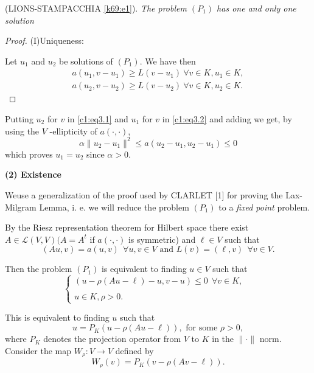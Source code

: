 \begin{theorem}\label{c1:thm3.1}%
(LIONS-STAMPACCHIA \ref{k69:e1}). {\em The problem $(P_1)$ has one and
 only one solution} 
\end{theorem}

\begin{proof}
(I)Uniqueness:

Let $u_1$ and $u_2$ be solutions of $(P_1)$. We have then 
\begin{gather}
a(u_1, v - u_1) \geq L(v - u_1) \ \forall v \in K, u_1
\in K, \tag{3.1}\label{c1:eq3.1}\\
a(u_2,v-u_2) \geq L(v-u_2) \ \forall v \in K, u_2 \in
K. \tag{3.2}\label{c1:eq3.2}
\end{gather}
\end{proof}

Putting $u_2$ for $v$ in \eqref{c1:eq3.1} and $u_1$ for $v$ in \eqref{c1:eq3.2}
and adding we get, by using the $V$ -ellipticity of $a(\cdot , \cdot)$, 
$$
\alpha \parallel u_2 - u_1 \parallel^2 \leq a(u_2 - u_1, u_2 - u_1)\leq 0
$$
which proves $u_1 = u_2$ since $\alpha > 0$.

\textbf{(2) Existence}

We\pageoriginale use a generalization of the proof used by CLARLET [1] for proving
the Lax-Milgram Lemma, i. e. we will reduce the problem $(P_1)$ to a
{\em fixed point} problem. 

By the Riesz representation theorem for Hilbert space there exist $A
\in \mathscr{L}(V, V) (A = A^t$ if $a(\cdot , \cdot)$ is symmetric) and
$\ell \in V$ such that  
\begin{equation}
(Au, v) = a(u, v) ~~\forall u, v \in V \text{ and }L(v) = (\ell,
  v) ~~\forall v \in V. \tag{3.3}\label{C1:eq3.3} 
\end{equation}

Then the problem $(P_1)$ is equivalent to finding $u \in V$ such that 
\begin{equation}
\begin{cases}
(u - \rho (Au - \ell) - u, v - u) \leq 0 ~~ \forall v \in K, \\
&\\
u \in K, \rho > 0.
\end{cases}\tag{3.4}\label{c1:eq3.4}
\end{equation}

This is equivalent to finding $u$ such that 
\begin{equation}
u = P_K(u - \rho (Au - \ell )), \text{ for some } \rho > 0,
\tag{3.5}\label{c1:eq3.5}
\end{equation}
where $P_K$ denotes the projection operator from $V$ to $K$ in the
$\parallel \cdot \parallel$ norm. Consider the map $W_\rho : V \to V$
defined by  
\begin{equation}
W_\rho (v) = P_K(v - \rho(Av - \ell)). \tag{3.6}\label{c1:eq3.6}
\end{equation}

